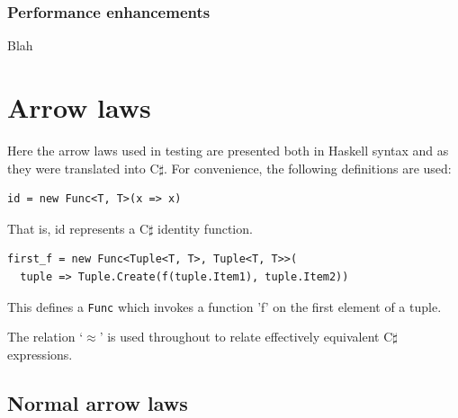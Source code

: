 \documentclass[12pt,twoside,notitlepage]{report}
\begin{document}
\subsection{Performance enhancements} \label{sec:performance_enhancements}

Blah

\cleardoublepage



\appendix

\chapter{Arrow laws} \label{sec:arrow_laws}

Here the arrow laws used in testing are presented both in Haskell syntax and as they were translated into C$\sharp$. For convenience, the following definitions are used:

\begin{lstlisting}
id = new Func<T, T>(x => x)
\end{lstlisting}

That is, id represents a C$\sharp$ identity function.

\begin{lstlisting}
first_f = new Func<Tuple<T, T>, Tuple<T, T>>(
  tuple => Tuple.Create(f(tuple.Item1), tuple.Item2))
\end{lstlisting}

This defines a \texttt{Func} which invokes a function 'f' on the first element of a tuple.

The relation `$\approx$' is used throughout to relate effectively equivalent C$\sharp$ expressions.

\section{Normal arrow laws} \label{sec:simle_arrow_laws}
\end{document}
